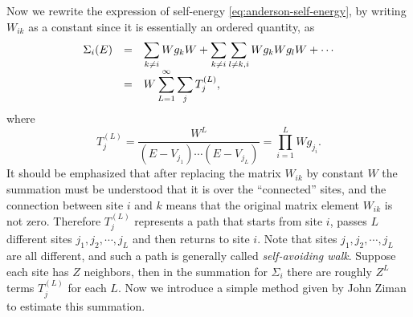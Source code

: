 \documentclass{book}
\numberwithin{equation}{section}
\begin{document}
Now we rewrite the expression of self-energy
\eqref{eq:anderson-self-energy}, by writing $W_{ik}$ as a constant
since it is essentially an ordered quantity, as
\begin{equation}
  \label{eq:self-energy-series}
  \begin{array}{rcl}
    \Sigma_i(E)&=&\displaystyle\sum_{k\ne i}Wg_kW+
    \sum_{k\ne i}\sum_{l\ne k,i}Wg_kWg_lW+\cdots\\\vbox to 14pt{}
    &=&\displaystyle W\sum_{L=1}^\infty\sum_{j}T_j^{(L)},\\
\end{array}
\end{equation}
where 
\begin{equation}
  T^{(L)}_j=\frac{W^L}{(E-V_{j_1})\cdots(E-V_{j_L})}=\prod_{i=1}^LWg_{j_i}.
\end{equation}
It should be emphasized that after replacing the matrix $W_{ik}$ by
constant $W$ the summation must be understood that it is over the
``connected'' sites, and the connection between site $i$ and $k$ means
that the original matrix element $W_{ik}$ is not zero. Therefore
$T^{(L)}_j$ represents a path that starts from site $i$, passes $L$
different sites $j_1,j_2,\cdots,j_L$ and then returns to site
$i$. Note that sites $j_1,j_2,\cdots,j_L$ are all different, and such
a path is generally called \textit{self-avoiding walk}. Suppose each
site has $Z$ neighbors, then in the summation for $\Sigma_i$ there are
roughly $Z^L$ terms $T^{(L)}_j$ for each $L$. Now we introduce a
simple method given by John Ziman to estimate this summation.
\end{document}

